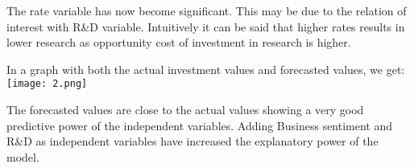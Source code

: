 \documentclass[12pt,a4paper,leqno]{report}
\theoremstyle{definition}
\begin{document}
The rate variable has now become significant. This may be due to the relation of interest with R\&D variable. Intuitively it can be said that higher rates results in lower research as opportunity cost of investment in  research is higher. 

In a graph with both the actual investment values and forecasted values, we get:\newline
\texttt{[image: 2.png]} 

The forecasted values are close to the actual values showing a very good predictive power of the independent variables. Adding Business sentiment and R\&D as independent variables have increased the explanatory power of the model. 
\end{document}

